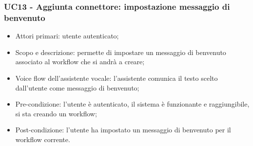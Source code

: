 \subsubsection{UC13 - Aggiunta connettore: impostazione messaggio di benvenuto}
\begin{itemize}
	\item  Attori primari: utente autenticato;
	\item  Scopo e descrizione: permette di impostare un messaggio di benvenuto associato al workflow che si andrà a creare;
	\item  Voice flow dell'assistente vocale: l'assistente comunica il testo scelto dall'utente come messaggio di benvenuto;
	\item  Pre-condizione: l'utente è autenticato, il sistema è funzionante e raggiungibile, si sta creando un workflow;
	\item  Post-condizione: l'utente ha impostato un messaggio di benvenuto per il workflow corrente.
\end{itemize}

